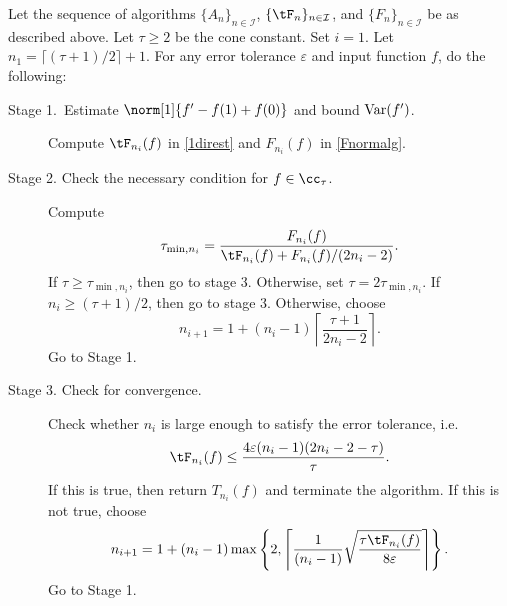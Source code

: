 \begin{algo} \label{multistageintegalgo}
Let the sequence of algorithms $\{A_n\}_{n\in \mathcal{I}}$, $\{\tF_n\}_{n\in \mathcal{I}}$, and $\{F_n\}_{n\in \mathcal{I}}$ be as described above. 
Let $\tau\ge2$ be the cone constant. Set $i=1$. Let $n_1=\lceil(\tau+1)/2\rceil+1$. For any error tolerance $\varepsilon$ and input function $f$, do the following:
\begin{description}
\item[Stage 1.\ Estimate {$\norm[1]{f'-f(1)+f(0)}$} and bound {$\operatorname{Var}(f')$}.] Compute $\tF_{n_i}(f)$ in \eqref{1direst} and $F_{n_i}(f)$ in \eqref{Fnormalg}.

\item[Stage 2. Check the necessary condition for $f \in \cc_{\tau}$.] Compute 
    \begin{align*}
     \tau_{\min,n_i} =  \frac{F_{n_i}(f)}{\tF_{n_i}(f)+F_{n_i}(f)/(2n_i-2)}.
    \end{align*}
If $\tau \ge \tau_{\min,n_i}$, then go to stage 3.  Otherwise, set $\tau = 2\tau_{\min,n_i}$.  If $n_i \ge (\tau+1)/2$, then go to stage 3.  Otherwise, choose 
$$
n_{i+1}=1+ (n_i-1)\left\lceil\frac{\tau+1}{2n_i-2}\right\rceil.
$$
Go to Stage 1.

\item[Stage 3. Check for convergence.] Check whether $n_i$ is large enough to satisfy the error tolerance, i.e.
    \begin{equation*}
     \tF_{n_i}(f) \le \frac{4\varepsilon(n_i-1)(2n_i-2 - \tau)}{\tau}.
    \end{equation*}
If this is true, then return $T_{n_i}(f)$ and terminate the algorithm.   If this is not true, choose
$$
n_{i+1}=1+ (n_i-1)\max\left\{2,\left\lceil\frac{1}{(n_i-1)}\sqrt{\frac{\tau \tF_{n_i}(f)}{8\varepsilon}}\right\rceil\right\}.
$$
Go to Stage 1.
\end{description}
\end{algo}

